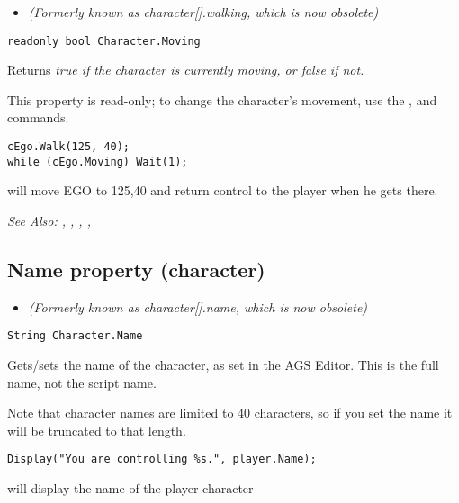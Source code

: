 \begin{itemize}
\item \it{(Formerly known as character[].walking, which is now obsolete)}
\end{itemize}

\begin{verbatim}
readonly bool Character.Moving
\end{verbatim}
Returns \it{true} if the character is currently moving, or \it{false} if not.

This property is read-only; to change the character's movement, use the ,
 and  commands.

\begin{verbatim}
cEgo.Walk(125, 40);
while (cEgo.Moving) Wait(1);
\end{verbatim}
will move EGO to 125,40 and return control to the player when he gets there.

\it{See Also:} ,
,
,
,


\subsection{Name property (character)}\label{Character.Name}%

\begin{itemize}
\item \it{(Formerly known as character[].name, which is now obsolete)}
\end{itemize}

\begin{verbatim}
String Character.Name
\end{verbatim}
Gets/sets the name of the character, as set in the AGS Editor. This is the full name,
not the script name.

Note that character names are limited to 40 characters, so if you set the name it
will be truncated to that length.

\begin{verbatim}
Display("You are controlling %s.", player.Name);
\end{verbatim}
will display the name of the player character


